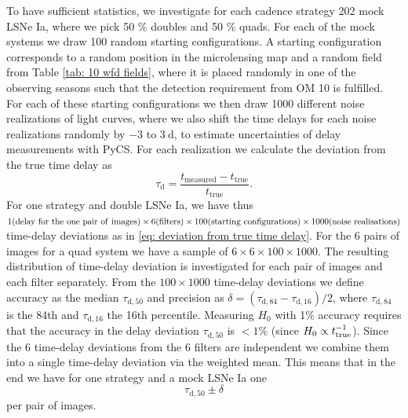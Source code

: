 To have sufficient statistics, we investigate for each cadence
strategy 202 mock LSNe Ia, where we pick 50 \% doubles and 50 \%
quads. For each of the mock systems we draw 100 random starting
configurations. A starting configuration corresponds to a random
position in the microlensing map and a random field from Table
\ref{tab: 10 wfd fields}, where it is placed randomly in one of the
observing seasons such that the detection requirement from OM 10 is
fulfilled. For each of these starting configurations we then draw 1000
different noise realizations of light curves, where we also shift the
time delays for each noise realizations randomly by $-3$ to
$\SI{3}{\day}$, to estimate uncertainties of delay measurements with
PyCS. For each realization we calculate the deviation from the true
time delay as
%
\begin{equation}
\tau_\mathrm{d} = \frac{t_\mathrm{measured} - t_\mathrm{true}}{t_\mathrm{true}}.
\label{eq: deviation from true time delay}
\end{equation}
For one strategy and double LSNe Ia, we have thus $1 {\rm (delay\ for\ the\
one\ pair\ of\ images)} \times 6 {\rm (filters)} \times 100 {\rm
(starting\ configurations)} \times 1000 {\rm (noise\ realisations)}$
time-delay deviations as in \eqref{eq: deviation from true time delay}.
For the 6 pairs of images for a quad system we have a sample of $6
\times 6 \times 100 \times 1000$. The resulting distribution of
time-delay deviation is investigated for each pair of images and each
filter separately. From the $100 \times 1000$ time-delay deviations we
define accuracy as the median $\tau_\mathrm{d,50}$ and precision as
$\delta = (\tau_\mathrm{d,84}-\tau_\mathrm{d,16})/2$, where
$\tau_\mathrm{d,84}$ is the 84th and $\tau_\mathrm{d,16}$ the 16th
percentile. Measuring $H_0$ with 1\% accuracy requires that the accuracy
in the delay deviation $\tau_\mathrm{d,50}$ is $<1\%$ (since $H_0 \propto
t_{\rm true}^{-1}$). Since the 6 time-delay deviations from the 6 filters are independent we combine them into a single time-delay deviation via the weighted mean. This means that in the end we have for one strategy and a mock LSNe Ia one 
\begin{equation}
\tau_\mathrm{d,50} \pm \delta
\label{eq: accuracy and precission}
\end{equation}
per pair of images.


